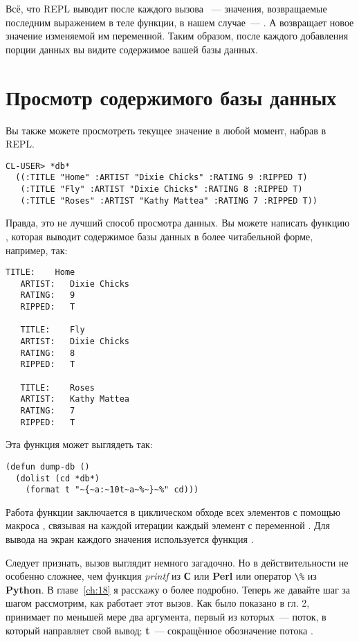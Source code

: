 Всё, что REPL выводит после каждого вызова ~--- значения, возвращаемые
последним выражением в теле функции, в нашем случае~--- . А 
возвращает новое значение изменяемой им переменной. Таким образом, после каждого
добавления порции данных вы видите содержимое вашей базы данных.

\section{Просмотр содержимого базы данных}

Вы также можете просмотреть текущее значение  в любой момент,
набрав  в REPL.

\begin{lstlisting}[style=lisprepl]
  CL-USER> *db*
  ((:TITLE "Home" :ARTIST "Dixie Chicks" :RATING 9 :RIPPED T)
   (:TITLE "Fly" :ARTIST "Dixie Chicks" :RATING 8 :RIPPED T)
   (:TITLE "Roses" :ARTIST "Kathy Mattea" :RATING 7 :RIPPED T))
\end{lstlisting}

Правда, это не лучший способ просмотра данных. Вы можете написать функцию ,
которая выводит содержимое базы данных в более читабельной форме, например, так:

\begin{lstlisting}[style=lisprepl]
   TITLE:    Home
   ARTIST:   Dixie Chicks
   RATING:   9
   RIPPED:   T
   
   TITLE:    Fly
   ARTIST:   Dixie Chicks
   RATING:   8
   RIPPED:   T
   
   TITLE:    Roses
   ARTIST:   Kathy Mattea
   RATING:   7
   RIPPED:   T
\end{lstlisting}

Эта функция может выглядеть так:

\begin{lstlisting}
(defun dump-db ()
  (dolist (cd *db*)
    (format t "~{~a:~10t~a~%~}~%" cd)))
\end{lstlisting}

Работа функции заключается в циклическом обходе всех элементов  с помощью макроса
, связывая на каждой итерации каждый элемент с переменной . Для
вывода на экран каждого значения  используется функция .

Следует признать, вызов  выглядит немного загадочно. Но в действительности
 не особенно сложнее, чем функция \textit{printf} из \textbf{С} или
\textbf{Perl} или оператор \lstinline!\%! из \textbf{Python}. В главе~\ref{ch:18} я расскажу о
 более подробно. Теперь же давайте шаг за шагом рассмотрим, как работает этот
вызов. Как было показано в гл. 2,  принимает по меньшей мере два аргумента,
первый из которых~--- поток, в который  направляет свой вывод; \textbf{t}~---
сокращённое обозначение потока .

